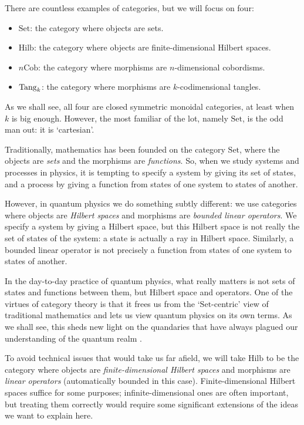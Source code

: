 \documentclass[12pt,twoside,openright]{report}
\newcommand{\Cob}{\mathrm{Cob}}
\newcommand{\Hilb}{\mathrm{Hilb}}
\newcommand{\Set}{\mathrm{Set}}
\newcommand{\Tang}{{\rm Tang}}
\begin{document}
There are countless examples of categories, but we will focus on four:
\begin{itemize}
\item $\Set$: the category where objects are sets.
\item $\Hilb$: the category where objects are finite-dimensional 
      Hilbert spaces.
\item $n\Cob$: the category where morphisms are $n$-dimensional 
      cobordisms.
\item $\Tang_k$: the category where morphisms are $k$-codimensional
      tangles.
\end{itemize}
As we shall see, all four are closed symmetric monoidal categories, at least when $k$ is big enough.  However, the most familiar of the lot, namely $\Set$, is the odd man out: it is `cartesian'.

Traditionally, mathematics has been founded on the category $\Set$, where the objects are {\em sets} and the morphisms are {\em functions}.  So, when we study systems and processes in physics, it is tempting to specify a system by giving its set of states, and a process by giving a function from states of one system to states of another.

However, in quantum physics we do something subtly different:
we use categories where objects are {\em Hilbert spaces} 
and morphisms are {\em bounded linear operators}.  We specify a system by giving a Hilbert space, but this Hilbert space is not really the set of states of the system: a state is actually a ray in Hilbert space.  Similarly, a bounded linear operator is not precisely a function from states of one system to states of another.  

In the day-to-day practice of quantum physics, what really matters is not sets of states and functions between them, but Hilbert space and operators.  One of the virtues of category theory is that it frees us from the `$\Set$-centric' view of traditional mathematics and lets us view quantum physics on its own terms.  As we shall see, this sheds new light on the quandaries that have always plagued our understanding of the quantum realm \cite{B4}.

To avoid technical issues that would take us far afield, we will take $\Hilb$ to be the category where objects are {\em finite-dimensional Hilbert spaces} and morphisms are {\em linear operators}
(automatically bounded in this case).  Finite-dimensional Hilbert spaces suffice for some purposes; infinite-dimensional ones are often important, but treating them correctly would require some significant extensions of the ideas we want to explain here.
\end{document}

